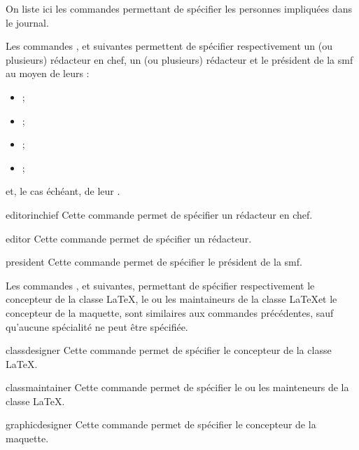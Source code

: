 On liste ici les commandes permettant de spécifier les personnes impliquées dans
le journal.

Les commandes ,  et 
suivantes permettent de spécifier respectivement un (ou plusieurs) rédacteur en
chef, un (ou plusieurs) rédacteur et le président de la \gls{smf} au moyen de
leurs :
\begin{itemize}
\item {} ;
\item {} ;
\item {} ;
\item {} ;
\end{itemize}
et, le cas échéant, de leur .

\begin{docCommand}{editorinchief}{}
  Cette commande permet de spécifier un rédacteur en chef.
\end{docCommand}

\begin{docCommand}{editor}{}
  Cette commande permet de spécifier un rédacteur.
\end{docCommand}

\begin{docCommand}{president}{}
  Cette commande permet de spécifier le président de la \gls{smf}.
\end{docCommand}

Les commandes ,  et
 suivantes, permettant de spécifier respectivement le
concepteur de la classe \LaTeX, le ou les maintaineurs de la classe \LaTeX et le
concepteur de la maquette, sont similaires aux commandes précédentes, sauf
qu'aucune spécialité ne peut être spécifiée.

\begin{docCommand}{classdesigner}{}
  Cette commande permet de spécifier le concepteur de la classe \LaTeX.
\end{docCommand}

\begin{docCommand}{classmaintainer}{}
  Cette commande permet de spécifier le ou les mainteneurs de la classe \LaTeX.
\end{docCommand}

\begin{docCommand}{graphicdesigner}{}
  Cette commande permet de spécifier le concepteur de la maquette.
\end{docCommand}


\iffalse
\fi
